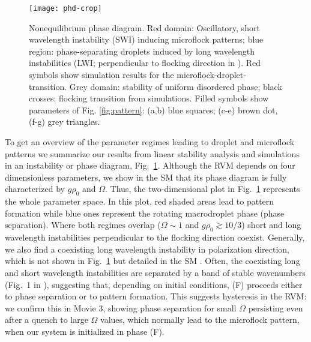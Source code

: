 \documentclass[aps,twocolumn,showlabels,showrefs,amsmath,amssymb,pre,superscriptaddress, floatfix, colors]{revtex4}
\newcommand{\1}{\begin{equation}}
\newcommand{\2}{\end{equation}}
\newcommand{\4}[2]{{\frac{#1}{#2}}}
\begin{document}
\begin{figure}
\begin{center}
\texttt{[image: phd-crop]}
\end{center}
\label{fig4}
\caption{\small Nonequilibrium phase diagram.
Red domain: Oscillatory, short wavelength instability (SWI) inducing microflock patterns; blue region: phase-separating droplets induced by long wavelength instabilities 
(LWI; perpendicular to flocking direction in \cite{SM}). 
Red symbols show simulation results for the microflock-droplet-transition. 
Grey domain: stability of uniform disordered phase; black crosses: flocking transition from simulations. 
Filled symbols show parameters of Fig. \ref{fig:pattern}: (a,b) blue squares; (c-e) brown dot, (f-g) grey triangles.
} 
\label{fig:phd}
\end{figure}

To get an overview of the parameter regimes leading to droplet and microflock patterns 
we summarize our results from linear stability analysis and 
simulations in an instability or phase diagram, Fig.~\ref{fig:phd}. 
Although the RVM depends on four dimensionless parameters, we show in the SM \cite{SM} that its phase diagram 
is fully characterized by $g\rho_0$ and $\Omega$. Thus, the two-dimensional plot in Fig.~\ref{fig:phd} represents the whole parameter space. 
In this plot, red shaded areas lead to pattern formation while blue ones represent the rotating macrodroplet phase (phase separation). 
Where both regimes overlap ($\Omega \sim 1$ and $g\rho_0 \gtrsim 10/3$) short and long wavelength instabilities perpendicular to the flocking 
direction coexist. Generally, we also find a coexisting long wavelength instability in polarization direction, 
which is not shown in Fig.~\ref{fig:phd} but detailed in the SM \cite{SM}.
Often, the coexisting long and short wavelength instabilities 
are separated by a band of stable wavenumbers (Fig.~1 in \cite{SM}), suggesting 
that, depending on initial conditions, (F) proceeds either to phase separation or to pattern formation. 
This suggests hysteresis in the RVM: we confirm this in Movie 3, showing 
phase separation for small $\Omega$ persisting even after a quench to large $\Omega$ values, which 
normally lead to the microflock pattern, when our system is initialized in phase (F).
\end{document}
